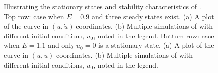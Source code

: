 \begin{figure}[!!!h!!!tb]
\centering
{}
\caption{ \label{Multi_stable_figure}Illustrating the stationary states and stability characteristics of . Top row: case when $E=0.9$ and three steady states exist. (a) A plot of the curve in $(u,\dot{u})$ coordinates. (b) Multiple simulations of  with different initial conditions, $u_0$, noted in the legend.  Bottom row: case when $E=1.1$ and only $u_0=0$ is a stationary state. (a) A plot of the curve in $(u,\dot{u})$ coordinates. (b) Multiple simulations of  with different initial conditions, $u_0$, noted in the legend.}
\end{figure}

